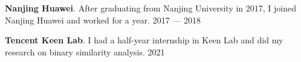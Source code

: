 \textbf{Nanjing Huawei}. After graduating from Nanjing University in 2017, I joined Nanjing Huawei and worked for a year. \hfill 2017 --- 2018

\textbf{Tencent Keen Lab}. I had a half-year internship in Keen Lab and did my research on binary similarity analysis. \hfill 2021


